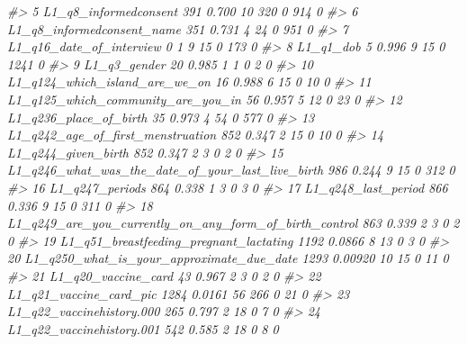 \documentclass[]{article}
\newenvironment{Shaded}{\begin{snugshade}}{\end{snugshade}}
\newcommand{\CommentTok}[1]{\textcolor[rgb]{0.56,0.35,0.01}{\textit{#1}}}
\begin{document}
\begin{Shaded}
\begin{Highlighting}[]
\CommentTok{#>  5 L1_q8_informedconsent                                        391       0.700    10 320     0      914          0}
\CommentTok{#>  6 L1_q8_informedconsent_name                                   351       0.731     4  24     0      951          0}
\CommentTok{#>  7 L1_q16_date_of_interview                                       0       1         9  15     0      173          0}
\CommentTok{#>  8 L1_q1_dob                                                      5       0.996     9  15     0     1241          0}
\CommentTok{#>  9 L1_q3_gender                                                  20       0.985     1   1     0        2          0}
\CommentTok{#> 10 L1_q124_which_island_are_we_on                                16       0.988     6  15     0       10          0}
\CommentTok{#> 11 L1_q125_which_community_are_you_in                            56       0.957     5  12     0       23          0}
\CommentTok{#> 12 L1_q236_place_of_birth                                        35       0.973     4  54     0      577          0}
\CommentTok{#> 13 L1_q242_age_of_first_menstruation                            852       0.347     2  15     0       10          0}
\CommentTok{#> 14 L1_q244_given_birth                                          852       0.347     2   3     0        2          0}
\CommentTok{#> 15 L1_q246_what_was_the_date_of_your_last_live_birth            986       0.244     9  15     0      312          0}
\CommentTok{#> 16 L1_q247_periods                                              864       0.338     1   3     0        3          0}
\CommentTok{#> 17 L1_q248_last_period                                          866       0.336     9  15     0      311          0}
\CommentTok{#> 18 L1_q249_are_you_currently_on_any_form_of_birth_control       863       0.339     2   3     0        2          0}
\CommentTok{#> 19 L1_q51_breastfeeding_pregnant_lactating                     1192       0.0866    8  13     0        3          0}
\CommentTok{#> 20 L1_q250_what_is_your_approximate_due_date                   1293       0.00920  10  15     0       11          0}
\CommentTok{#> 21 L1_q20_vaccine_card                                           43       0.967     2   3     0        2          0}
\CommentTok{#> 22 L1_q21_vaccine_card_pic                                     1284       0.0161   56 266     0       21          0}
\CommentTok{#> 23 L1_q22_vaccinehistory.000                                    265       0.797     2  18     0        7          0}
\CommentTok{#> 24 L1_q22_vaccinehistory.001                                    542       0.585     2  18     0        8          0}

\end{Highlighting}
\end{Shaded}
\end{document}
